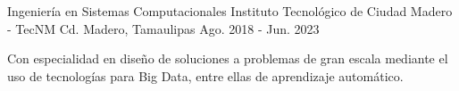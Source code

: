 

\begin{cventries}

  \cventry
    {Ingeniería en Sistemas Computacionales} %
    {Instituto Tecnológico de Ciudad Madero - TecNM} %
    {Cd. Madero, Tamaulipas} %
    {Ago. 2018 - Jun. 2023} %
    {
      \begin{cvitems} %
        \item {Con especialidad en diseño de soluciones a problemas de gran escala mediante el uso de tecnologías para Big Data, entre ellas de aprendizaje automático.}
      \end{cvitems}
    }

\end{cventries}
